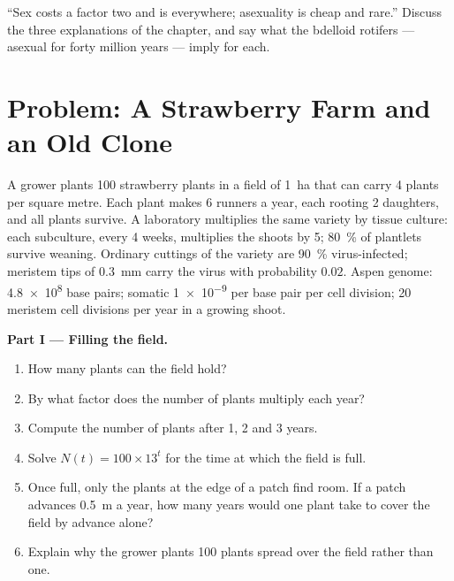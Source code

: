 \begin{exercise}[$\star\star\star$]\label{exo:b2:asexual-reproduction:12}
``Sex costs a factor two and is everywhere; asexuality is cheap and
rare.'' Discuss the three explanations of the chapter, and say what
the bdelloid rotifers --- asexual for forty million years --- imply
for each.
\end{exercise}

\section{Problem: A Strawberry Farm and an Old Clone}

\begin{problem}
\label{pb:b2:asexual-reproduction:1}
A grower plants \num{100} strawberry plants in a field of
\qty{1}{ha} that can carry \num{4} plants per square metre. Each
plant makes \num{6} runners a year, each rooting \num{2} daughters,
and all plants survive. A laboratory multiplies the same variety by
tissue culture: each subculture, every \num{4} weeks, multiplies the
shoots by \num{5}; \qty{80}{\%} of plantlets survive weaning.
Ordinary cuttings of the variety are \qty{90}{\%} virus-infected;
meristem tips of \qty{0.3}{mm} carry the virus with probability
$0.02$. Aspen genome: \qty{4.8e8}{} base pairs; somatic 
\qty{1e-9}{} per base pair per cell division; \num{20} meristem cell
divisions per year in a growing shoot.

\medskip
\noindent\textbf{Part I --- Filling the field.}
\begin{enumerate}
  \item How many plants can the field hold?
  \item By what factor does the number of plants multiply each year?
  \item Compute the number of plants after 1, 2 and 3 years.
  \item Solve $N(t) = 100\times 13^{t}$ for the time at which the
        field is full.
  \item Once full, only the plants at the edge of a patch find room.
        If a patch advances \qty{0.5}{m} a year, how many years would
        one plant take to cover the field by advance alone?
  \item Explain why the grower plants \num{100} plants spread over the
        field rather than one.
\end{enumerate}


\end{problem}
